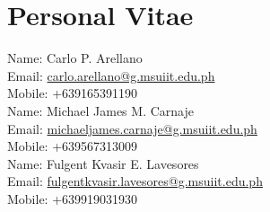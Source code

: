 \chapter{Personal Vitae}

\noindent Name: Carlo P. Arellano\\
Email: \href{mailto:carlo.arellano@g.msuiit.edu.ph}{carlo.arellano@g.msuiit.edu.ph}\\
Mobile: +639165391190\\

\noindent Name: Michael James M. Carnaje\\
Email: \href{mailto:michaeljames.carnaje@g.msuiit.edu.ph}{michaeljames.carnaje@g.msuiit.edu.ph}\\
Mobile: +639567313009\\

\noindent Name: Fulgent Kvasir E. Lavesores\\
Email: \href{mailto:fulgentkvasir.lavesores@g.msuiit.edu.ph}{fulgentkvasir.lavesores@g.msuiit.edu.ph}\\
Mobile: +639919031930\\
